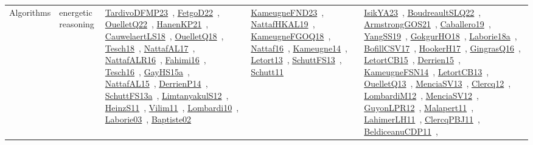 {\begin{longtable}{lp{3cm}>{\raggedright\arraybackslash}p{6cm}>{\raggedright\arraybackslash}p{6cm}>{\raggedright\arraybackslash}p{8cm}}
Algorithms & energetic reasoning & \href{works/TardivoDFMP23.pdf}{TardivoDFMP23}~\cite{TardivoDFMP23}, \href{works/FetgoD22.pdf}{FetgoD22}~\cite{FetgoD22}, \href{works/OuelletQ22.pdf}{OuelletQ22}~\cite{OuelletQ22}, \href{works/HanenKP21.pdf}{HanenKP21}~\cite{HanenKP21}, \href{works/CauwelaertLS18.pdf}{CauwelaertLS18}~\cite{CauwelaertLS18}, \href{works/OuelletQ18.pdf}{OuelletQ18}~\cite{OuelletQ18}, \href{works/Tesch18.pdf}{Tesch18}~\cite{Tesch18}, \href{works/NattafAL17.pdf}{NattafAL17}~\cite{NattafAL17}, \href{works/NattafALR16.pdf}{NattafALR16}~\cite{NattafALR16}, \href{works/Fahimi16.pdf}{Fahimi16}~\cite{Fahimi16}, \href{works/Tesch16.pdf}{Tesch16}~\cite{Tesch16}, \href{works/GayHS15a.pdf}{GayHS15a}~\cite{GayHS15a}, \href{works/NattafAL15.pdf}{NattafAL15}~\cite{NattafAL15}, \href{works/DerrienP14.pdf}{DerrienP14}~\cite{DerrienP14}, \href{works/SchuttFS13a.pdf}{SchuttFS13a}~\cite{SchuttFS13a}, \href{works/LimtanyakulS12.pdf}{LimtanyakulS12}~\cite{LimtanyakulS12}, \href{works/HeinzS11.pdf}{HeinzS11}~\cite{HeinzS11}, \href{works/Vilim11.pdf}{Vilim11}~\cite{Vilim11}, \href{works/Lombardi10.pdf}{Lombardi10}~\cite{Lombardi10}, \href{works/Laborie03.pdf}{Laborie03}~\cite{Laborie03}, \href{works/Baptiste02.pdf}{Baptiste02}~\cite{Baptiste02} & \href{works/KameugneFND23.pdf}{KameugneFND23}~\cite{KameugneFND23}, \href{works/NattafHKAL19.pdf}{NattafHKAL19}~\cite{NattafHKAL19}, \href{works/KameugneFGOQ18.pdf}{KameugneFGOQ18}~\cite{KameugneFGOQ18}, \href{works/Nattaf16.pdf}{Nattaf16}~\cite{Nattaf16}, \href{works/Kameugne14.pdf}{Kameugne14}~\cite{Kameugne14}, \href{works/Letort13.pdf}{Letort13}~\cite{Letort13}, \href{works/SchuttFS13.pdf}{SchuttFS13}~\cite{SchuttFS13}, \href{works/Schutt11.pdf}{Schutt11}~\cite{Schutt11} & \href{works/IsikYA23.pdf}{IsikYA23}~\cite{IsikYA23}, \href{works/BoudreaultSLQ22.pdf}{BoudreaultSLQ22}~\cite{BoudreaultSLQ22}, \href{works/ArmstrongGOS21.pdf}{ArmstrongGOS21}~\cite{ArmstrongGOS21}, \href{works/Caballero19.pdf}{Caballero19}~\cite{Caballero19}, \href{works/YangSS19.pdf}{YangSS19}~\cite{YangSS19}, \href{works/GokgurHO18.pdf}{GokgurHO18}~\cite{GokgurHO18}, \href{works/Laborie18a.pdf}{Laborie18a}~\cite{Laborie18a}, \href{works/BofillCSV17.pdf}{BofillCSV17}~\cite{BofillCSV17}, \href{works/HookerH17.pdf}{HookerH17}~\cite{HookerH17}, \href{works/GingrasQ16.pdf}{GingrasQ16}~\cite{GingrasQ16}, \href{works/LetortCB15.pdf}{LetortCB15}~\cite{LetortCB15}, \href{works/Derrien15.pdf}{Derrien15}~\cite{Derrien15}, \href{works/KameugneFSN14.pdf}{KameugneFSN14}~\cite{KameugneFSN14}, \href{works/LetortCB13.pdf}{LetortCB13}~\cite{LetortCB13}, \href{works/OuelletQ13.pdf}{OuelletQ13}~\cite{OuelletQ13}, \href{works/MenciaSV13.pdf}{MenciaSV13}~\cite{MenciaSV13}, \href{works/Clercq12.pdf}{Clercq12}~\cite{Clercq12}, \href{works/LombardiM12.pdf}{LombardiM12}~\cite{LombardiM12}, \href{works/MenciaSV12.pdf}{MenciaSV12}~\cite{MenciaSV12}, \href{works/GuyonLPR12.pdf}{GuyonLPR12}~\cite{GuyonLPR12}, \href{works/Malapert11.pdf}{Malapert11}~\cite{Malapert11}, \href{works/LahimerLH11.pdf}{LahimerLH11}~\cite{LahimerLH11}, \href{works/ClercqPBJ11.pdf}{ClercqPBJ11}~\cite{ClercqPBJ11}, \href{works/BeldiceanuCDP11.pdf}{BeldiceanuCDP11}~\cite{BeldiceanuCDP11}, 
\end{longtable}}
